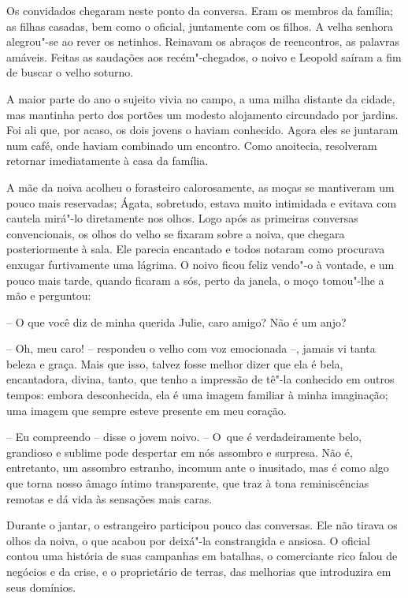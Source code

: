 Os convidados chegaram neste ponto da conversa. Eram os membros da
família; as filhas casadas, bem como o oficial, juntamente com os
filhos. A velha senhora alegrou"-se ao rever os netinhos. Reinavam os
abraços de reencontros, as palavras amáveis. Feitas as saudações aos
recém"-chegados, o noivo e Leopold saíram a fim de buscar o velho soturno.

A maior parte do ano o sujeito vivia no campo, a uma milha distante da
cidade, mas mantinha perto dos portões um modesto alojamento circundado
por jardins. Foi ali que, por acaso, os dois jovens o haviam conhecido.
Agora eles se juntaram num café, onde haviam combinado um encontro.
Como anoitecia, resolveram retornar imediatamente à casa da família. 

A mãe da noiva acolheu o forasteiro calorosamente, as moças se
mantiveram um pouco mais reservadas; Ágata, sobretudo, estava muito
intimidada e evitava com cautela mirá"-lo diretamente nos olhos. Logo
após as primeiras conversas convencionais, os olhos do velho se fixaram
sobre a noiva, que chegara posteriormente à sala. Ele parecia encantado
e todos notaram como procurava enxugar furtivamente uma lágrima. O
noivo ficou feliz vendo"-o à vontade, e um pouco mais tarde, quando
ficaram a sós, perto da janela, o moço tomou"-lhe a mão e perguntou: 

-- O que você diz de minha querida Julie, caro amigo? Não é um anjo?

-- Oh, meu caro! -- respondeu o velho com voz emocionada --, jamais vi
tanta beleza e graça. Mais que isso, talvez fosse melhor dizer que ela
é bela, encantadora, divina, tanto, que tenho a impressão de tê"-la
conhecido em outros tempos: embora desconhecida, ela é uma imagem
familiar à minha imaginação; uma imagem que sempre esteve presente em
meu coração. 

-- Eu compreendo -- disse o jovem noivo. -- \mbox{O que} é verdadeiramente belo, 
grandioso e sublime pode \mbox{despertar} em nós assombro e surpresa. Não é,
entretanto, um assombro estranho, incomum ante o inusitado, mas é como
algo que torna nosso âmago íntimo transparente, que traz à tona
reminiscências remotas e dá vida às sensações mais caras. 

Durante o jantar, o estrangeiro participou pouco das conversas. Ele não
tirava os olhos da noiva, o que acabou por deixá"-la constrangida e
ansiosa. O oficial contou uma história de suas campanhas em batalhas, o
comerciante rico falou de negócios e da crise, e o proprietário de
terras, das melhorias que introduzira em seus domínios. 

